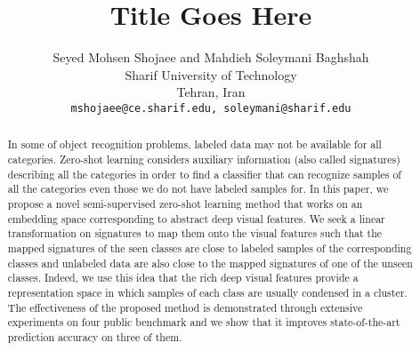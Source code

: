 \documentclass[10pt,twocolumn,letterpaper]{article}
\begin{document}
\title{Title Goes Here}
 \author{Seyed Mohsen Shojaee and Mahdieh Soleymani Baghshah\\
 Sharif University of Technology \\
 Tehran, Iran\\
 {\tt\small mshojaee@ce.sharif.edu, soleymani@sharif.edu}
 }

\maketitle

\begin{abstract}
In some of object recognition problems, labeled data may not be available for all categories. Zero-shot learning considers auxiliary information (also called signatures) describing all the categories in order to find a classifier that can recognize samples of all the categories even those we do not have labeled samples for.
In this paper, we propose a novel semi-supervised zero-shot learning method that works on an embedding space corresponding to abstract deep visual features. We seek a linear transformation on signatures to map them onto the visual features such that the mapped signatures of the seen classes are close to labeled samples of the corresponding classes and unlabeled data are also close to the mapped signatures of one of the unseen classes. Indeed, we use this idea that the rich deep visual features provide a representation space in which samples of each class are usually condensed in a cluster. The effectiveness of the proposed method is demonstrated through extensive
experiments on four public benchmark and we show that it improves state-of-the-art prediction accuracy on three of them.
\end{abstract}
\end{document}
